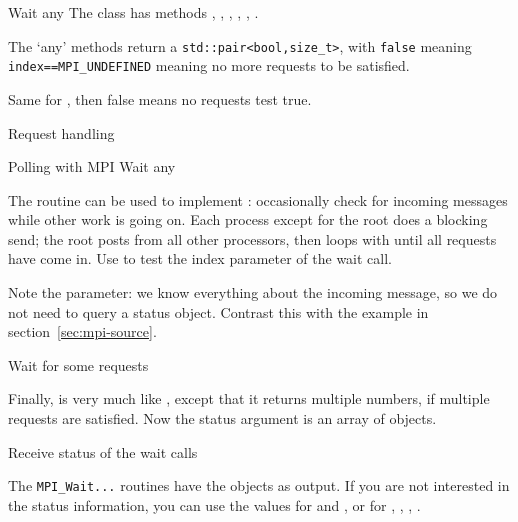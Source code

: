 \begin{mplnote}{Wait any}
  \label{mpl:wait_any}
  The  class has methods
  , ,
  , ,
  , .

  The `any' methods return a \lstinline+std::pair<bool,size_t>+,
  with \lstinline{false} meaning \lstinline+index==MPI_UNDEFINED+
  meaning no more requests to be satisfied.

  Same for , then false means no requests test true.
\end{mplnote}

\begin{mplnote}{Request handling}
  \label{mpl:req_handle}
\end{mplnote}

 {Polling with MPI Wait any}

The  routine can be used to implement
: occasionally check for incoming messages while
other work is going on.
%
%
%
Each process except for the root does a blocking send; the root
posts  from all other processors, then loops
with  until all requests have come in. Use
 to test the index parameter of the wait
call.

Note the  parameter: we know everything
about the incoming message, so we do not need to query a status object.
Contrast this with the example in section~\ref{sec:mpi-source}.

 {Wait for some requests}

Finally,  is very much like ,
except that it returns multiple numbers, if multiple requests are
satisfied. Now the status argument is an array of 
objects.

 {Receive status of the wait calls}
\label{sec:mpi-wait-status}

The \lstinline{MPI_Wait...} routines have the 
objects as output.
If you are not interested in
the status information, you can use the values
 for  and
,
or 
for , ,
, .

